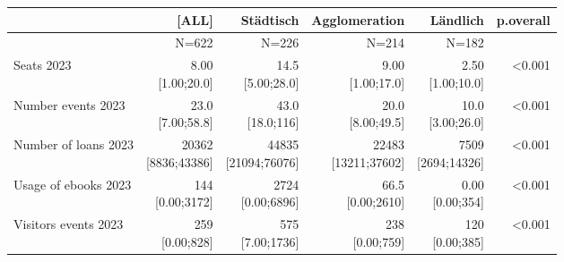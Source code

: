 \documentclass[a4paper,
fontsize=11pt,
oneside,
numbers=noperiodatend,
parskip=half-,
bibliography=totoc,
final
]{scrartcl}
\begin{document}
\begin{landscape}
\begin{table}[]\centering
\begin{tabular}{lrrrrr}
\hline
                                 & \textbf{{[}ALL{]}}       & \textbf{Städtisch}        & \textbf{Agglomeration}   & \textbf{Ländlich}      & \textbf{p.overall} \\ \hline
                                 & N=622                    & N=226                     & N=214                    & N=182                  &                    \\ \hline
Seats 2023                       & \makecell{ 8.00 \\ {[}1.00;20.0{]}}     & \makecell{ 14.5 \\ {[}5.00;28.0{]}}      & \makecell{ 9.00 \\ {[}1.00;17.0{]}}     & \makecell{ 2.50 \\ {[}1.00;10.0{]}}   & \textless{}0.001   \\ \hline
Number events 2023               & \makecell{ 23.0 \\ {[}7.00;58.8{]}}     & \makecell{ 43.0 \\ {[}18.0;116{]}}       & \makecell{ 20.0 \\ {[}8.00;49.5{]}}     & \makecell{ 10.0 \\ {[}3.00;26.0{]}}   & \textless{}0.001   \\ \hline
Number of loans 2023             & \makecell{ 20362 \\ {[}8836;43386{]}}   & \makecell{ 44835 \\ {[}21094;76076{]}}   & \makecell{ 22483 \\ {[}13211;37602{]}}  & \makecell{ 7509 \\ {[}2694;14326{]}}  & \textless{}0.001   \\ \hline
Usage of ebooks 2023             & \makecell{ 144 \\ {[}0.00;3172{]}}      & \makecell{ 2724 \\ {[}0.00;6896{]}}      & \makecell{ 66.5 \\ {[}0.00;2610{]}}     & \makecell{ 0.00 \\ {[}0.00;354{]}}    & \textless{}0.001   \\ \hline
Visitors events 2023             & \makecell{ 259 \\ {[}0.00;828{]}}       & \makecell{ 575 \\ {[}7.00;1736{]}}       & \makecell{ 238 \\ {[}0.00;759{]}}       & \makecell{ 120 \\ {[}0.00;385{]}}     & \textless{}0.001   \\ \hline

\end{tabular}
\end{table}
\end{landscape}
\end{document}

